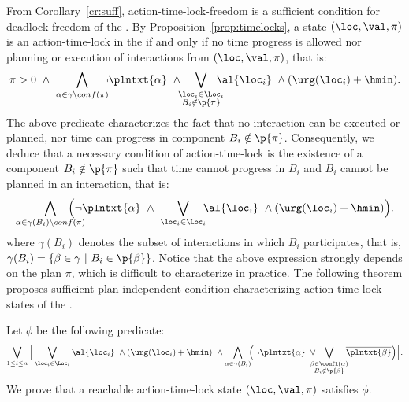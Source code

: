 From Corollary~\ref{cr:suff}, action-time-lock-freedom is a sufficient 
condition for deadlock-freedom of the \lpsabr.
By Proposition~\ref{prop:timelocks}, a state $(\loc,\val,\pi)$ is an action-time-lock in the 
\lps if and only if no time progress is allowed nor planning or execution of interactions from 
$(\loc,\val,\pi)$, that is:
\begin{displaymath}
  \pi>0 \ \wedge \ \bigwedge_{\alpha \in \gamma \setminus conf(\pi)} \hspace*{-2ex} \neg
  \plntxt{\alpha} \ \wedge
  \hspace*{-1ex} \bigvee_{\substack{\loc_i \in \Loc_i \\ B_i \notin \p{\pi}}} \hspace*{-2ex} 
  \al{\loc_i} \ \wedge(\urg(\loc_i) + \hmin).
\end{displaymath}
The above predicate characterizes the fact that no interaction can be executed or planned, 
nor time can progress in component $B_i \notin \p{\pi}$.
Consequently, we deduce that a necessary condition of action-time-lock is the existence of a 
component $B_i \notin \p{\pi}$ such that time cannot progress in $B_i$ and $B_i$ cannot be 
planned in an interaction, that is:
\begin{displaymath}
  \bigwedge_{\substack{\alpha \in \gamma(B_i) \setminus conf(\pi)}} \hspace*{-4ex} 
  \Big(\neg\plntxt{\alpha} \ \wedge \ \bigvee_{\loc_i \in \Loc_i} \hspace*{-1ex} \al{\loc_i} \ 
  \wedge(\urg(\loc_i) + \hmin)\Big).
\end{displaymath}
where $\gamma(B_i)$ denotes the subset of interactions in which $B_i$ participates, that is, 
$\gamma(B_i) = \{ \beta \in \gamma \ | \ B_i \in \p{\beta} \}$.
Notice that the above expression strongly depends on the plan $\pi$, which is difficult to 
characterize in practice.
The following theorem proposes sufficient plan-independent condition characterizing 
action-time-lock states of the \lpsabrb.
\begin{theorem}\label{thm:dla}
  Let $\phi$ be the following predicate:
\begin{displaymath}
  \bigvee_{1\le i\le n}\Big[\bigvee_{\loc_i \in \Loc_i}\al{\loc_i}\ \wedge(\urg(\loc_i)+\hmin) \ 
  \wedge\bigwedge_{\alpha \in \gamma(B_i)}\hspace*{-1ex}\Big(  \neg\plntxt{\alpha} \
  \vee\hspace*{-2ex}\bigvee_{\substack{\beta\in\confl(\alpha)\\B_i\notin\p{\beta}}}\hspace*{-1ex}
  \overline{\plntxt{\beta}} \Big)\Big].
\end{displaymath}
We prove that a reachable action-time-lock state $(\loc,\val,\pi)$ satisfies $\phi$.
\end{theorem}
